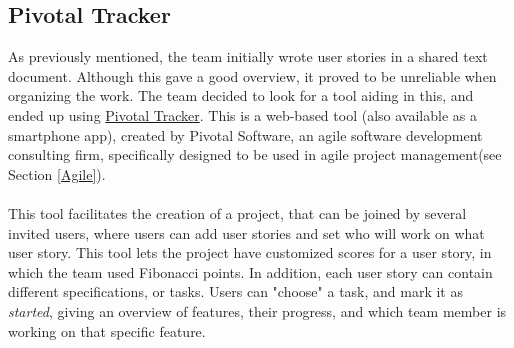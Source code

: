 	\subsection{Pivotal Tracker} \label{Pivotal_Tracker}
	\vspace{-5mm}
	As previously mentioned, the team initially wrote user stories in a shared text document. Although this gave a good overview, it proved to be unreliable when organizing the work. The team decided to look for a tool aiding in this, and ended up using \href{https://www.pivotaltracker.com/}{Pivotal Tracker}.\cite{pivotal} This is a web-based tool (also available as a smartphone app), created by Pivotal Software\cite{pivotallabs}, an agile software development consulting firm, specifically designed to be used in agile project management(see Section \ref{Agile}). \\\\This tool facilitates the creation of a project, that can be joined by several invited users, where users can add user stories and set who will work on what user story. This tool lets the project have customized scores for a user story, in which the team used Fibonacci points. In addition, each user story can contain different specifications, or tasks. Users can "choose" a task, and mark it as \textit{started}, giving an overview of features, their progress, and which team member is working on that specific feature.
	
	